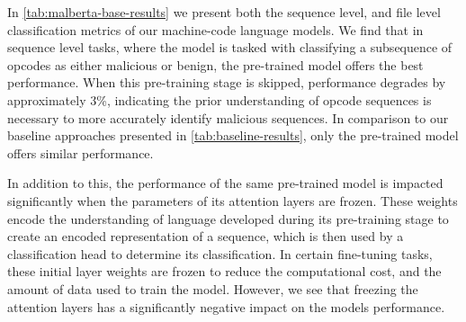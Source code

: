 \documentclass[main.tex]{subfiles}
\begin{document}
\begin{table}[h]
    \centering
    \caption{Performance of our RoBERTa model for opcode sequence classification and malware detection}
    \label{tab:malberta-base-results}
\end{table}

\noindent
In \cref{tab:malberta-base-results} we present both the sequence level, and file level classification metrics of our machine-code language models. We find that in sequence level tasks, where the model is tasked with classifying a subsequence of opcodes as either malicious or benign, the pre-trained model offers the best performance. When this pre-training stage is skipped, performance degrades by approximately 3\%, indicating the prior understanding of opcode sequences is necessary to more accurately identify malicious sequences. In comparison to our baseline approaches presented in \cref{tab:baseline-results}, only the pre-trained model offers similar performance. 

In addition to this, the performance of the same pre-trained model is impacted significantly when the parameters of its attention layers are frozen. These weights encode the understanding of language developed during its pre-training stage to create an encoded representation of a sequence, which is then used by a classification head to determine its classification. In certain fine-tuning tasks, these initial layer weights are frozen to reduce the computational cost, and the amount of data used to train the model. However, we see that freezing the attention layers has a significantly negative impact on the models performance. 
\end{document}
